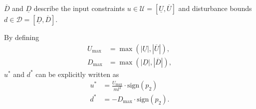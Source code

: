 \documentclass[../main.tex]{subfiles}
\begin{document}
$\overline{D}$ and $\underline{D}$ describe the input constraints $u\in \mathcal{U} = [\underline{U},\overline{U}]$ and disturbance bounds $d\in \mathcal{D} = [\underline{D},\overline{D}]$. 

\iffalse

By defining 
\begin{align}
    U_{\text{max}} &= \max(|\underline{U}|,|\overline{U}|), \\
    D_{\text{max}} &= \max(|\underline{D}|,|\overline{D}|), 
\end{align} 
$u^*$ and $d^*$ can be explicitly written as
\begin{align}
    u^* &= \frac{U_{\text{max}}}{ml^2} \cdot \text{sign}(p_2)\\
    d^* &= -D_{\text{max}} \cdot \text{sign}(p_2).
\end{align}
\end{document}
